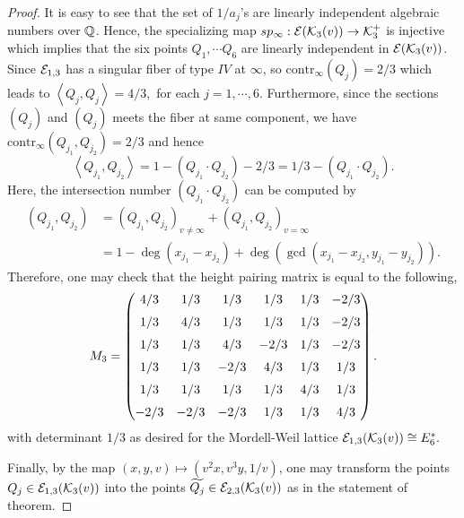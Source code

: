 \documentclass[11pt]{amsart}
\begin{document}
\begin{proof}
	It is easy to see  that  the set of $1/a_j$'s are linearly independent algebraic numbers over ${\mathbb Q}$.  Hence,  the specializing map $sp_{\infty}: {\mathcal E}({\mathcal K}_3(v)) \rightarrow {\mathcal K}_3^+$ is injective which implies that the six points $Q_1, \cdots Q_6$ are linearly independent in   ${\mathcal E}({\mathcal K}_3(v))$. 
	Since ${\mathcal E}_{1, 3}$ has a singular fiber of type $IV$ at $\infty$, so $\text{contr}_\infty(Q_j)= 2/3$ which leads to 
	$ \left\langle Q_j, Q_j\right\rangle = 4/3,$ for each $j=1,\cdots, 6$.
	Furthermore,  since   the sections  $(Q_j)$ and  $(Q_j)$ meets the fiber at same component,  we have  $\text{contr}_\infty (Q_{j_1}, Q_{j_2})= 2/3$ and hence 
	$$\left\langle Q_{j_1}, Q_{j_2}\right\rangle = 1 - (Q_{j_1}\cdot  Q_{j_2})- 2/3= 1/3 - (Q_{j_1}\cdot  Q_{j_2}).$$ 
	Here, the intersection number $(Q_{j_1}\cdot  Q_{j_2})$ can be computed by 
	\begin{align*}
		\left( Q_{j_1}, Q_{j_2}\right)& = \left( Q_{j_1}, Q_{j_2}\right)_{v\neq \infty} +\left( Q_{j_1}, Q_{j_2}\right)_{v=\infty} \\
		& = 1- \deg(x_{j_1}-x_{j_2}) +\deg( \gcd (x_{j_1}-x_{j_2}, y_{j_1}-y_{j_2})  ).
	\end{align*}
	Therefore, one may check that  the height pairing matrix   is equal to the following,
	$$M_3=  \begin{pmatrix} 
		4/3  & 1/3  & 1/3  & 1/3  & 1/3  & -2/3
	\\ \noalign{\medskip}
	1/3  & 4/3  & 1/3  & 1/3  & 1/3  & -2/3\\ \noalign{\medskip}
	1/3  & 1/3  & 4/3  & -2/3  & 1/3  & -2/3\\ \noalign{\medskip}
	1/3  & 1/3  & -2/3  & 4/3  & 1/3  & 1/3	\\ \noalign{\medskip}
	1/3  & 1/3  & 1/3  & 1/3  & 4/3  & 1/3\\ \noalign{\medskip}
	-2/3  & -2/3  & -2/3  & 1/3  & 1/3  & 4/3
	 \end{pmatrix}. 	$$
	with determinant $1/3$ as desired for the Mordell-Weil lattice ${\mathcal E}_{1,3}({\mathcal K}_3(v)) \cong E_6^*.$
	
	Finally, by the map $(x, y, v) \mapsto (v^2 x, v^3 y, 1/v)$, one may transform the points
	$Q_j \in {\mathcal E}_{1, 3}({\mathcal K}_3(v))$
	into the points $\widetilde{Q_j} \in {\mathcal E}_{2, 3}({\mathcal K}_3(v))$	 as in the statement of theorem.
\end{proof}	








\end{document}
